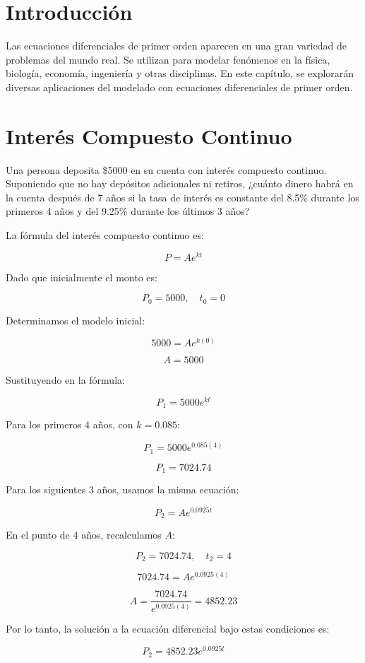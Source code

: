 \section{Introducción}
Las ecuaciones diferenciales de primer orden aparecen en una gran variedad de problemas del mundo real. 
Se utilizan para modelar fenómenos en la física, biología, economía, ingeniería y otras disciplinas.
En este capítulo, se explorarán diversas aplicaciones del modelado con ecuaciones diferenciales de primer orden.


\section{Interés Compuesto Continuo}

Una persona deposita \$5000 en su cuenta con interés compuesto continuo. Suponiendo que no hay depósitos adicionales ni retiros, ¿cuánto dinero habrá en la cuenta después de 7 años si la tasa de interés es constante del 8.5\% durante los primeros 4 años y del 9.25\% durante los últimos 3 años?

La fórmula del interés compuesto continuo es:

\[
P = A e^{kt}
\]

Dado que inicialmente el monto es:

\[
P_0 = 5000, \quad t_0 = 0
\]

Determinamos el modelo inicial:

\[
5000 = A e^{k(0)}
\]

\[
A = 5000
\]

Sustituyendo en la fórmula:

\[
P_1 = 5000 e^{kt}
\]

Para los primeros 4 años, con \( k = 0.085 \):

\[
P_1 = 5000 e^{0.085(4)}
\]

\[
P_1 = 7024.74
\]

Para los siguientes 3 años, usamos la misma ecuación:

\[
P_2 = A e^{0.0925 t}
\]

En el punto de 4 años, recalculamos \( A \):

\[
P_2 = 7024.74, \quad t_2 = 4
\]

\[
7024.74 = A e^{0.0925(4)}
\]

\[
A = \frac{7024.74}{e^{0.0925(4)}} = 4852.23
\]

Por lo tanto, la solución a la ecuación diferencial bajo estas condiciones es:

\[
P_2 = 4852.23 e^{0.0925 t}
\]

